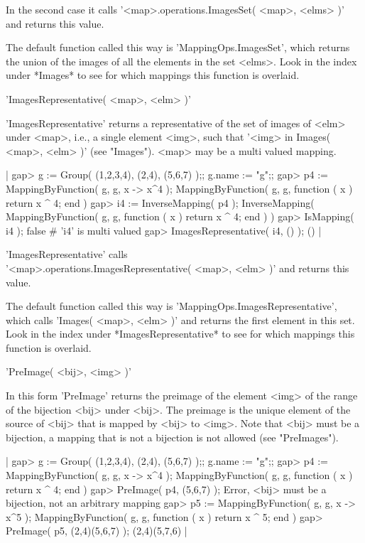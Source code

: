 In the second case it calls '<map>.operations.ImagesSet( <map>, <elms> )'
and returns this value.

The default  function  called this  way  is 'MappingOps.ImagesSet', which
returns the union of the images of  all the elements  in  the set <elms>.
Look in the index under *Images* to see for which mappings this  function
is overlaid.


'ImagesRepresentative( <map>, <elm> )'

'ImagesRepresentative'  returns a representative of  the set of images of
<elm>  under <map>,  i.e.,  a single element  <img>,  such that '<img> in
Images(  <map>,  <elm> )' (see "Images").   <map>  may be  a multi valued
mapping.

|    gap> g := Group( (1,2,3,4), (2,4), (5,6,7) );;  g.name := "g";;
    gap> p4 := MappingByFunction( g, g, x -> x^4 );
    MappingByFunction( g, g, function ( x )
        return x ^ 4;
    end )
    gap> i4 := InverseMapping( p4 );
    InverseMapping( MappingByFunction( g, g, function ( x )
        return x ^ 4;
    end ) )
    gap> IsMapping( i4 );
    false    # 'i4' is multi valued
    gap> ImagesRepresentative( i4, () );
    () |

'ImagesRepresentative' calls \\
'<map>.operations.ImagesRepresentative( <map>, <elm> )'
and returns this value.

The       default      function       called       this      way       is
'MappingOps.ImagesRepresentative', which calls 'Images(  <map>,  <elm> )'
and  returns the first  element  in this set.   Look in  the  index under
*ImagesRepresentative*  to  see  for  which  mappings  this  function  is
overlaid.


'PreImage( <bij>, <img> )'

In this form 'PreImage' returns the preimage  of the element <img> of the
range  of the bijection  <bij>  under <bij>.  The preimage is  the unique
element of the  source of <bij> that is  mapped  by <bij> to <img>.  Note
that <bij> must be a bijection, a mapping that is not a  bijection is not
allowed (see "PreImages").

|    gap> g := Group( (1,2,3,4), (2,4), (5,6,7) );;  g.name := "g";;
    gap> p4 := MappingByFunction( g, g, x -> x^4 );
    MappingByFunction( g, g, function ( x )
        return x ^ 4;
    end )
    gap> PreImage( p4, (5,6,7) );
    Error, <bij> must be a bijection, not an arbitrary mapping
    gap> p5 := MappingByFunction( g, g, x -> x^5 );
    MappingByFunction( g, g, function ( x )
        return x ^ 5;
    end )
    gap> PreImage( p5, (2,4)(5,6,7) );
    (2,4)(5,7,6) |

